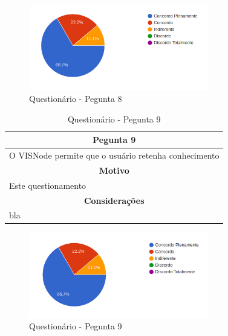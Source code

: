 \documentclass[
	12pt,				%
	oneside,			%
	a4paper,			%
	english,			%
	french,				%
	spanish,			%
	brazil,				%
	]{abntex2}
\begin{document}
\begin{figure}[H]
\centering
\caption{Questionário - Pegunta 8}
\includegraphics[width=0.7\textwidth]{imagens/v1/p8.png}
\sourceAuthor
\end{figure}

\begin{table}[H]
\centering
\caption{Questionário - Pegunta 9} 
\def\arraystretch{1.5}
\begin{tabular}{l}
\hline
\multicolumn{1}{c}{\textbf{Pegunta 9}}              \\ \hline
O VISNode permite que o usuário retenha conhecimento \\ \hline
\multicolumn{1}{c}{\textbf{Motivo}}                 \\ \hline
Este questionamento                                   \\ \hline
\multicolumn{1}{c}{\textbf{Considerações}}          \\ \hline
bla                                                   \\ \hline
\end{tabular}
\sourceAuthor
\end{table}

\begin{figure}[H]
\centering
\caption{Questionário - Pegunta 9}
\includegraphics[width=0.7\textwidth]{imagens/v1/p9.png}
\sourceAuthor
\end{figure}
\end{document}
